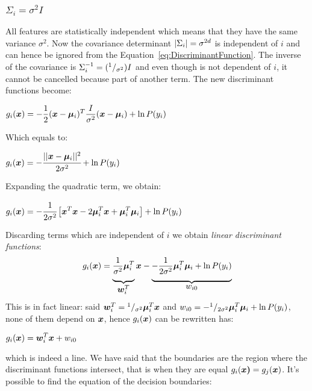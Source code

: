 \subsubsection{$\Sigma_i=\sigma^2I$}
All features are statistically independent which means that they have the same variance $\sigma^2$. \newline
Now the covariance determinant $\vert \Sigma_i \vert=\sigma^{2d}$ is independent of $i$ and can hence be ignored from the Equation~\ref{eq:DiscriminantFunction}.\newline
The inverse of the covariance is $\Sigma^{-1}_i=({}^{1}/_{\sigma^2})I$ and even though is not dependent of $i$, it cannot be cancelled because part of another term.
The new discriminant functions become:
\begin{center}
	$\displaystyle g_i(\bm{x})=-\frac{1}{2}(\bm{x}-\bm{\mu}_i)^T\frac{I}{\sigma^2}(\bm{x}-\bm{\mu}_i)+\ln{P(y_i)}$
\end{center}
Which equals to:
\begin{center}
	$\displaystyle g_i(\bm{x})=-\cfrac{\vert \vert \bm{x}-\bm{\mu}_i \vert \vert^2}{2\sigma^2}+\ln{P(y_i)}$
\end{center}
Expanding the quadratic term, we obtain:
\begin{center}
	$\displaystyle g_i(\bm{x})=-\cfrac{1}{2\sigma^2}\left[\bm{x}^T\bm{x}-2\bm{\mu}^T_i\bm{x}+\bm{\mu}^T_i\bm{\mu}_i\right]+\ln{P(y_i)}$
\end{center}
Discarding terms which are independent of $i$ we obtain \textit{linear discriminant functions}:
\begin{equation}
	g_i(\vect{x})=
	\underbrace{\frac{1}{\sigma^2}\vect{\mu}^T_i    \rule[-12pt]{0pt}{5pt}}_{\mbox{$\vect{w}_{i}^T$}}\vect{x}
	-\underbrace{-\frac{1}{2\sigma^2}\vect{\mu}^T_i\vect{\mu}_i+\ln{P(y_i)} \rule[-12pt]{0pt}{5pt}}_{\mbox{$w_{i0}$}}
\end{equation}
This is in fact linear: said $\bm{w}_i^T={}^{1}/_{\sigma^2}\bm{\mu}_i^T\bm{x}$ and $w_{i0}=-{}^{1}/_{2\sigma^2}\bm{\mu}^T_i\bm{\mu}_i+\ln{P(y_i)}$, none of them depend on $\bm{x}$, hence $g_i(\bm{x})$ can be rewritten has:
\begin{center}
	$\displaystyle g_i(\bm{x})=\bm{w}_i^T\bm{x}+w_{i0}$
\end{center}
which is indeed a line. \newline
We have said that the boundaries are the region where the discriminant functions intersect, that is when they are equal $g_i(\bm{x)}=g_j(\bm{x})$. It's possible to find the equation of the decision boundaries:

